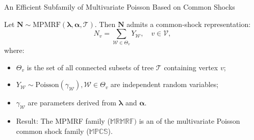 \documentclass[11pt,xcolor={dvipsnames},hyperref={pdftex,pdfpagemode=UseNone,hidelinks,pdfdisplaydoctitle=true},usepdftitle=false]{beamer}
\begin{document}
\begin{frame}{An Efficient Subfamily of Multivariate Poisson Based on Common Shocks}
\begin{theorem}
Let $\boldsymbol{N} \sim \text{MPMRF}(\boldsymbol{\lambda}, \boldsymbol{\alpha}, \mathcal{T})$. Then $\boldsymbol{N}$ admits a common-shock representation:
    \begin{equation*}
    N_v = \sum_{\mathcal{W} \in \Theta_v} Y_{\mathcal{W}}, \quad v \in \mathcal{V},
    \end{equation*}
    where:
    \begin{itemize}
        \item $\Theta_v$ is the set of all connected subsets of tree $\mathcal{T}$ containing vertex $v$;
        \item $Y_{\mathcal{W}} \sim \text{Poisson}(\gamma_{\mathcal{W}}), \mathcal{W} \in \Theta_v$ are independent random variables;
        \item $\gamma_{\mathcal{W}}$ are parameters derived from $\boldsymbol{\lambda}$ and $\boldsymbol{\alpha}$.
    \end{itemize}
\end{theorem}

\vspace{0.3cm}
\begin{itemize}
    \item Result: The MPMRF family ($\mathbb{MRMRF})$ is an  of the multivariate Poisson common shock family ($\mathbb{MPCS}$). 
\end{itemize}
\end{frame}
\end{document}
